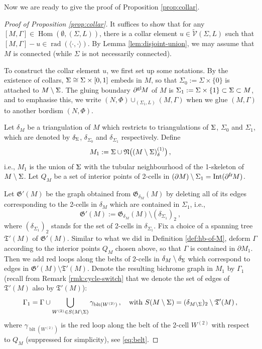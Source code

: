 \documentclass[11pt]{amsart}
\theoremstyle{definition}
\numberwithin{equation}{section}
\def\bd{{\partial}}
\def\nb{\mathfrak{N}}
\newcommand{\bdf}[1]{{\bd^{\operatorname{fr}}\hspace{-1pt}{#1}}}
\newcommand{\bdg}[1]{{\bd^{\operatorname{gl}}\hspace{-1pt}{#1}}}
\newcommand{\pair}[1]{\langle #1 \rangle}
\def\ourV{\cV}
\def\tbv{\widetilde{\ourV}}
\newcommand{\bbSigma}{%
  \mathord{
    \tikz[baseline=(char.base)]{
      \node[inner sep=0pt] (char) {$\Sigma$}; %
\begin{scope}[xshift=0.5]
      \draw[line width=0.3pt] (-0.05,0.115)--(0.03,0.002);
      \draw[line width=0.3pt] (-0.06,-0.115)--(0.035,0.004);
\end{scope}
    }
  }
}
\newcommand\scalemath[2]{\scalebox{#1}{\mbox{\ensuremath{\displaystyle #2}}}}
\newcommand{\smbbSigma}{\scalemath{0.7}{\bbSigma}}
\def\intr{{\operatorname{Int}}}
\newcommand{\twoCell}[1]{{#1}^{(2)}}
\newcommand{\ourGraph}{\fG}
\newcommand{\spnTree}{\fT}
\newcommand{\belt}{\operatorname{blt}}
\def\cV{\mathcal{V}}
\def\de{\delta}
\def\fG{\mathfrak{G}}
\def\fT{{\mathfrak{T}}}
\def\Hom{{\operatorname{Hom}}}
\def\Rad{{\operatorname{rad}}}
\def\rad{\Rad}
\begin{document}
Now we are ready to give the proof of Proposition \ref{prop:collar}.

\begin{proof}[Proof of Proposition \ref{prop:collar}]
It suffices to show that for any $[M, \Gamma] \in \Hom(\emptyset, (\Sigma, L))$, there is a collar element $u \in \tbv(\Sigma, L)$ such that $[M, \Gamma]-u \in \rad(\pair{\cdot, \cdot})$. By Lemma \ref{lem:disjoint-union}, we may assume that $M$ is connected (while $\Sigma$ is not necessarily connected). 

To construct the collar element $u$, we first set up some notations. By the existence of collars, $\bbSigma \cong \Sigma \times [0,1]$ embeds in $M$, so that $\Sigma_0 := \Sigma\times\{0\}$ is attached to $M \setminus \bbSigma$. The gluing boundary $\bdg M$ of $M$ is $\Sigma_{1} := \Sigma\times\{1\}\subset \bbSigma\subset M$, and to emphasise this, we write $(N, \Phi) \cup_{(\Sigma_1, L)} (M, \Gamma)$ when we glue $(M, \Gamma)$ to another bordism $(N, \Phi)$.

Let $\de_M$ be a triangulation of $M$ which restricts to  triangulations of $\bbSigma$, $\Sigma_0$ and $\Sigma_1$, which are denoted by $\de_{\smbbSigma}$, $\de_{\Sigma_{0}}$ and $\de_{\Sigma_{1}}$ respectively. Define 
\[M_1 := \bbSigma \cup \nb\big((M\setminus\bbSigma)_{\de}^{(1)}\big)\,,\]
i.e., $M_1$ is the union of $\bbSigma$ with the tubular neighbourhood of the 1-skeleton of $M\setminus\bbSigma$.
Let $Q_M$ be a set of interior points of 2-cells in $(\bd M) \setminus \Sigma_{1} = \intr(\bdf M)$.

Let $\ourGraph'(M)$ be the graph obtained from $\ourGraph_{\de_M}(M)$ by deleting all of its edges corresponding to the 2-cells in $\de_M$ which are contained in $\Sigma_1$, i.e., 
\begin{equation}\label{eq:G'}
\ourGraph'(M) := \ourGraph_{\de_M}(M) \setminus (\de_{\Sigma_{1}})_{2} \ ,
\end{equation}
where $(\de_{\Sigma_{1}})_{2}$ stands for the set of 2-cells in $\de_{\Sigma_{1}}$. 
Fix a choice of a spanning tree $\spnTree'(M)$ of $\ourGraph'(M)$. Similar to what we did in Definition \ref{def:hb-of-M}, deform $\Gamma$ according to the interior points $Q_M$ chosen above, so that $\Gamma$ is contained in $\bd M_1$. Then we add red loops along the belts of 2-cells in $\de_{M}\setminus \de_{\smbbSigma}$ which correspond to edges in $\ourGraph'(M)\setminus \spnTree'(M)$. Denote the resulting bichrome graph in $M_1$ by $\Gamma_1$ (recall from Remark \ref{rmk:cycle-switch} that we denote the set of edges of $\spnTree'(M)$ also by $\spnTree'(M)$):
\begin{equation}\label{eq:gamma-1}
\Gamma_1 = \Gamma \cup \bigcup_{\twoCell{W} \in S(M\setminus\smbbSigma)} \gamma_{\belt(\twoCell{W})}\,, \quad\text{with $S(M\setminus\bbSigma) = (\de_{M\setminus \smbbSigma})_2 \setminus \spnTree'(M)$}\,,
\end{equation}
where $\gamma_{\belt(\twoCell{W})}$ is the red loop along the belt of the 2-cell $\twoCell{W}$ with respect to $Q_M$
(suppressed for simplicity), see \eqref{eq:belt}.


\end{proof}
\end{document}
